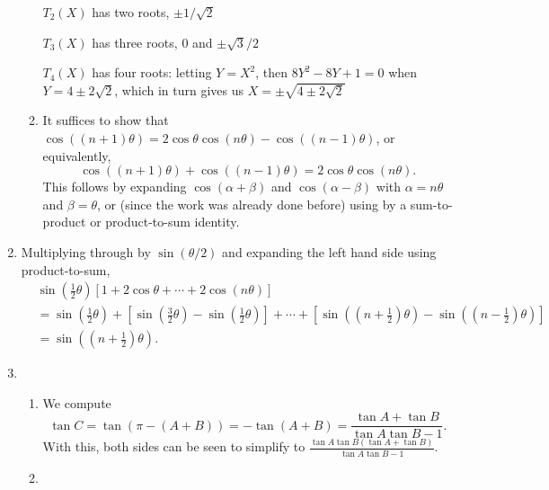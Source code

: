 \begin{enumerate}
\begin{enumerate}
$T_2(X)$ has two roots, $\pm 1/\sqrt{2}$\par
$T_3(X)$ has three roots, $0$ and $\pm\sqrt{3}/2$\par
$T_4(X)$ has four roots: letting $Y = X^2$, then $8Y^2 - 8Y + 1 = 0$ when $Y = 4\pm 2\sqrt{2}$, which in turn gives us $X = \pm\sqrt{4\pm 2\sqrt{2}}$
\item It suffices to show that $\cos((n + 1)\theta) = 2\cos\theta\cos(n\theta) - \cos((n - 1)\theta)$, or equivalently,
\begin{equation*}
\cos((n + 1)\theta) + \cos((n - 1)\theta) = 2\cos\theta\cos(n\theta).
\end{equation*}
This follows by expanding $\cos(\alpha + \beta)$ and $\cos(\alpha - \beta)$ with $\alpha = n\theta$ and $\beta = \theta$, or (since the work was already done before) using by a sum-to-product or product-to-sum identity.
\end{enumerate}
\item Multiplying through by $\sin(\theta/2)$ and expanding the left hand side using product-to-sum,
\begin{align*}
&\sin\left(\frac{1}{2}\theta\right)\left[1 + 2\cos\theta + \cdots + 2\cos (n\theta)\right] \\
&= \sin\left(\frac{1}{2}\theta\right) + \left[\sin\left(\frac{3}{2}\theta\right) - \sin\left(\frac{1}{2}\theta\right)\right] + \cdots + \left[\sin\left(\left(n + \frac{1}{2}\right)\theta\right) - \sin\left(\left(n - \frac{1}{2}\right)\theta\right)\right] \\
&= \sin\left(\left(n + \frac{1}{2}\right)\theta\right).
\end{align*}
\item \begin{enumerate}
\item We compute
\begin{equation*}
\tan C = \tan(\pi - (A + B)) = -\tan(A + B) = \frac{\tan A + \tan B}{\tan A\tan B - 1}.
\end{equation*}
With this, both sides can be seen to simplify to $\frac{\tan A\tan B(\tan A + \tan B)}{\tan A\tan B - 1}$.
\item 
\end{enumerate}
\end{enumerate}
